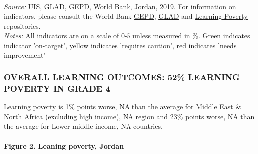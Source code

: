 \documentclass[twocolumn]{article}
\let\oldparagraph\paragraph
\renewcommand{\paragraph}[1]{\oldparagraph{#1}\mbox{}}
\begin{document}
\begin{table}[H]
\\
\color{darkgray}\scriptsize{\textit{Source:} UIS, GLAD, GEPD, World Bank, Jordan, 2019. For information on indicators, please consult the World Bank \href{https://github.com/worldbank/GEPD}{\underline{GEPD}}, \href{https://github.com/worldbank/GLAD}{\underline{GLAD}} and \href{https://github.com/worldbank/LearningPoverty}{\underline{Learning Poverty}} repositories.}\\
\color{darkgray}\scriptsize{\textit{Notes:} All indicators are on a scale of 0-5 unless measured in \%. Green indicates indicator 'on-target', yellow indicates 'requires caution', red indicates 'needs improvement'}
\end{table}
\raggedbottom

\hypertarget{overall-learning-outcomes-52-learning-poverty-in-grade-4}{%
\subsubsection{\texorpdfstring{\textbf{OVERALL LEARNING OUTCOMES: 52\%
LEARNING POVERTY IN GRADE
4}}{OVERALL LEARNING OUTCOMES: 52\% LEARNING POVERTY IN GRADE 4}}\label{overall-learning-outcomes-52-learning-poverty-in-grade-4}}

Learning poverty is 1\% points worse, NA than the average for Middle
East \& North Africa (excluding high income), NA region and 23\% points
worse, NA than the average for Lower middle income, NA countries.

\hypertarget{figure-2.-leaning-poverty-jordan}{%
\paragraph{Figure 2. Leaning poverty,
Jordan}\label{figure-2.-leaning-poverty-jordan}}
\end{document}
